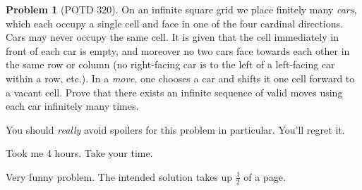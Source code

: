 \documentclass[11pt]{article} %
\theoremstyle{definition}
\newtheorem{problem}{Problem}
\theoremstyle{remark}
\begin{document}
\begin{problem}[POTD 320]
    On an infinite square grid we place finitely many \emph{cars}, which each occupy a single cell and face in one of the four cardinal directions. Cars may never occupy the same cell. It is given that the cell immediately in front of each car is empty, and moreover no two cars face towards each other in the same row or column (no right-facing car is to the left of a left-facing car within a row, etc.). In a \emph{move}, one chooses a car and shifts it one cell forward to a vacant cell. Prove that there exists an infinite sequence of valid moves using each car infinitely many times. 
    \begin{talks}
        \begin{talk}
            You should \emph{really} avoid spoilers for this problem in particular. You'll regret it.
        \end{talk}
        \begin{talk}
            Took me 4 hours. Take your time.
        \end{talk}
        \begin{talk}
            Very funny problem. The intended solution takes up \(\frac{1}{2}\) of a page.
        \end{talk}
    \end{talks}
\end{problem}
\end{document}
